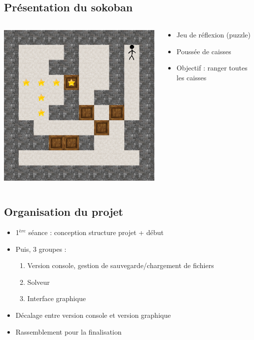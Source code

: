 \documentclass{beamer}
\begin{document}
\subsection{Présentation du sokoban}
\begin{frame} %
\begin{columns}
\hspace{0.5cm}
\begin{column}{5cm}
\includegraphics[scale=0.3]{images/sokoban.png}
\end{column}
\begin{column}{6cm}
\begin{itemize}
\item Jeu de réflexion (puzzle)
\item Poussée de caisses
\item Objectif : ranger toutes les caisses
\end{itemize}
\end{column}
\end{columns}
\end{frame}

\subsection{Organisation du projet}
\begin{frame}
\begin{itemize}
\item 1$^{ère}$ séance : conception structure projet + début
\item Puis, 3 groupes :
\begin{enumerate}
\item Version console, gestion de sauvegarde/chargement de fichiers
\item Solveur
\item Interface graphique
\end{enumerate}
\item Décalage entre version console et version graphique
\item Rassemblement pour la finalisation
\end{itemize}
\end{frame}
\end{document}
